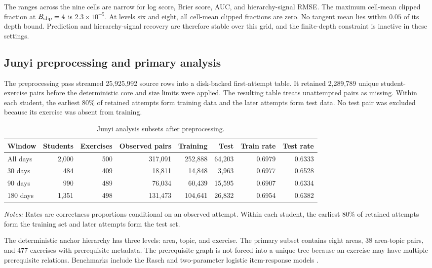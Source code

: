 \documentclass[
  12pt]{article}
\newcommand{\TableNote}[1]{%
  \par\vspace{0.35em}\noindent
  \begin{minipage}{0.96\linewidth}
    \footnotesize\setstretch{1.05}\raggedright
    \textit{Notes:} #1
  \end{minipage}%
  \par\vspace{0.6\baselineskip}%
}
\theoremstyle{definition}
\theoremstyle{plain}
\begin{document}
The ranges across the nine cells are narrow for log score, Brier score, AUC, and hierarchy-signal RMSE. The maximum cell-mean clipped fraction at $B_{\rm clip}=4$ is $2.3\times10^{-5}$. At levels six and eight, all cell-mean clipped fractions are zero. No tangent mean lies within $0.05$ of its depth bound. Prediction and hierarchy-signal recovery are therefore stable over this grid, and the finite-depth constraint is inactive in these settings.


\subsection{Junyi preprocessing and primary analysis}
\label{supp:junyi-results}

The preprocessing pass streamed 25,925,992 source rows into a disk-backed first-attempt table. It retained 2,289,789 unique student-exercise pairs before the deterministic core and size limits were applied. The resulting table treats unattempted pairs as missing. Within each student, the earliest 80\% of retained attempts form training data and the later attempts form test data. No test pair was excluded because its exercise was absent from training.

\begin{table}[H]
	\centering
	\scriptsize
	\caption{Junyi analysis subsets after preprocessing.}
	\label{tab:junyi-subsets}
	\begin{tabular}{lrrrrrrr}
		\toprule
		Window & Students & Exercises & Observed pairs & Training & Test & Train rate & Test rate \\
		\midrule
		All days & 2,000 & 500 & 317,091 & 252,888 & 64,203 & 0.6979 & 0.6333 \\
		30 days & 484 & 409 & 18,811 & 14,848 & 3,963 & 0.6977 & 0.6528 \\
		90 days & 990 & 489 & 76,034 & 60,439 & 15,595 & 0.6907 & 0.6334 \\
		180 days & 1,351 & 498 & 131,473 & 104,641 & 26,832 & 0.6954 & 0.6382 \\
		\bottomrule
	\end{tabular}
	\TableNote{Rates are correctness proportions conditional on an observed attempt. Within each student, the earliest 80\% of retained attempts form the training set and later attempts form the test set.}
\end{table}

The deterministic anchor hierarchy has three levels: area, topic, and exercise. The primary subset contains eight areas, 38 area-topic pairs, and 477 exercises with prerequisite metadata. The prerequisite graph is not forced into a unique tree because an exercise may have multiple prerequisite relations. Benchmarks include the Rasch and two-parameter logistic item-response models \citep{birnbaum_1968_LatentTraitModels,rasch_1980_ProbabilisticModelsIntelligence}.
\end{document}
